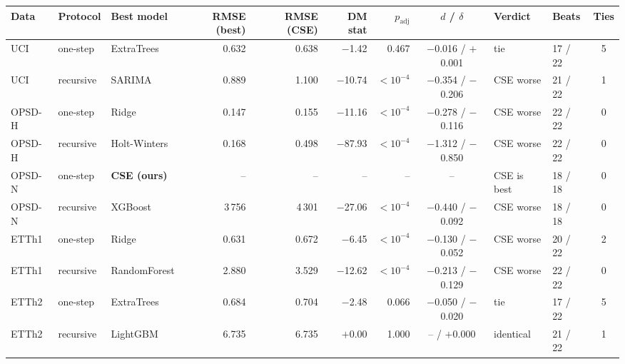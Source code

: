 \begin{tabular}{lllrrrrcllc}
\toprule
Data & Protocol & Best model & RMSE (best) & RMSE (CSE) & DM stat & $p_{\mathrm{adj}}$ & $d$ / $\delta$ & Verdict & Beats & Ties \\
\midrule
UCI & one-step & ExtraTrees & 0.632 & 0.638 & $-$1.42 & 0.467 & $-$0.016 / $+$0.001 & tie & 17 / 22 & 5 \\
UCI & recursive & SARIMA & 0.889 & 1.100 & $-$10.74 & $< 10^{-4}$ & $-$0.354 / $-$0.206 & CSE worse & 21 / 22 & 1 \\
OPSD-H & one-step & Ridge & 0.147 & 0.155 & $-$11.16 & $< 10^{-4}$ & $-$0.278 / $-$0.116 & CSE worse & 22 / 22 & 0 \\
OPSD-H & recursive & Holt-Winters & 0.168 & 0.498 & $-$87.93 & $< 10^{-4}$ & $-$1.312 / $-$0.850 & CSE worse & 22 / 22 & 0 \\
OPSD-N & one-step & \textbf{CSE (ours)} & -- & -- & -- & -- & -- & CSE is best & 18 / 18 & 0 \\
OPSD-N & recursive & XGBoost & 3\,756 & 4\,301 & $-$27.06 & $< 10^{-4}$ & $-$0.440 / $-$0.092 & CSE worse & 18 / 18 & 0 \\
ETTh1 & one-step & Ridge & 0.631 & 0.672 & $-$6.45 & $< 10^{-4}$ & $-$0.130 / $-$0.052 & CSE worse & 20 / 22 & 2 \\
ETTh1 & recursive & RandomForest & 2.880 & 3.529 & $-$12.62 & $< 10^{-4}$ & $-$0.213 / $-$0.129 & CSE worse & 22 / 22 & 0 \\
ETTh2 & one-step & ExtraTrees & 0.684 & 0.704 & $-$2.48 & 0.066 & $-$0.050 / $-$0.020 & tie & 17 / 22 & 5 \\
ETTh2 & recursive & LightGBM & 6.735 & 6.735 & $+$0.00 & 1.000 & -- / $+$0.000 & identical & 21 / 22 & 1 \\
\bottomrule
\end{tabular}
